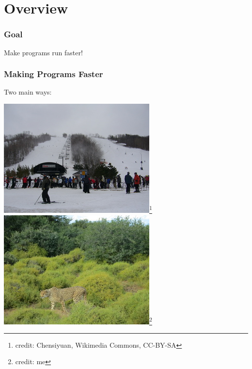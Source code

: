 \documentclass[aspectratio=43]{beamer}
\newenvironment{changemargin}[1]{%
  \begin{list}{}{%
    \setlength{\topsep}{0pt}%
    \setlength{\leftmargin}{#1}%
    \setlength{\rightmargin}{1em}
    \setlength{\listparindent}{\parindent}%
    \setlength{\itemindent}{\parindent}%
    \setlength{\parsep}{\parskip}%
  }%
  \item[]}{\end{list}}
\begin{document}
\section{Overview}
\begin{frame}
  \frametitle{Goal}

\hspace*{3em} \Large Make programs run faster!
\end{frame}

\begin{frame}
  \frametitle{Making Programs Faster}

  \begin{changemargin}{2cm}
  Two main ways:\\[1em]
  \end{changemargin}
  \begin{center}
  \includegraphics[width=.4\textwidth]{L01/Blue_Mountain_Resort_small.JPG}\footnote{credit: Chensiyuan, Wikimedia Commons, CC-BY-SA} \hspace*{.1\textwidth}
  \includegraphics[width=.4\textwidth]{L01/2893_cheetah.JPG}\footnote{credit: me}
  \end{center}
\end{frame}
  
\end{document}
